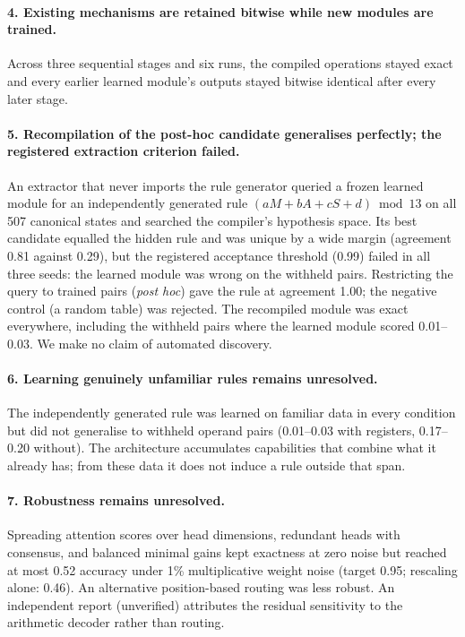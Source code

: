 \documentclass[11pt]{article}
\begin{document}
\paragraph{4. Existing mechanisms are retained bitwise while new modules are trained.} Across three sequential
stages and six runs, the compiled operations stayed exact and every earlier learned module's outputs stayed bitwise
identical after every later stage.

\paragraph{5. Recompilation of the post-hoc candidate generalises perfectly; the registered extraction criterion
failed.} An extractor that never imports the rule generator queried a frozen learned module for an independently
generated rule $(aM+bA+cS+d)\bmod13$ on all 507 canonical states and searched the compiler's hypothesis space. Its
best candidate equalled the hidden rule and was unique by a wide margin (agreement 0.81 against 0.29), but the
registered acceptance threshold (0.99) failed in all three seeds: the learned module was wrong on the withheld pairs.
Restricting the query to trained pairs (\emph{post hoc}) gave the rule at agreement 1.00; the negative control (a
random table) was rejected. The recompiled module was exact everywhere, including the withheld pairs where the learned
module scored 0.01--0.03. We make no claim of automated discovery.

\paragraph{6. Learning genuinely unfamiliar rules remains unresolved.} The independently generated rule was learned
on familiar data in every condition but did not generalise to withheld operand pairs (0.01--0.03 with registers,
0.17--0.20 without). The architecture accumulates capabilities that combine what it already has; from these data it
does not induce a rule outside that span.

\paragraph{7. Robustness remains unresolved.} Spreading attention scores over head dimensions, redundant heads with
consensus, and balanced minimal gains kept exactness at zero noise but reached at most 0.52 accuracy under 1\%
multiplicative weight noise (target 0.95; rescaling alone: 0.46). An alternative position-based routing was less
robust. An independent report (unverified) attributes the residual sensitivity to the arithmetic decoder rather than
routing.
\end{document}
